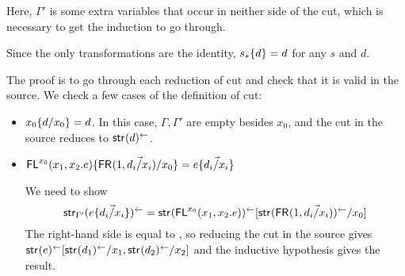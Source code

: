 \begin{enumerate}
\begin{itemize}
Here, $\Gamma'$ is some extra variables that occur in neither side of
the cut, which is necessary to get the induction to go through.

Since the only transformations are the identity, $s_*\{d\} = d$ for
any $s$ and $d$.  

The proof is to go through each reduction of cut and check that it is
valid in the source.  We check a few cases of the definition of cut:

\begin{itemize}
\item 
$x_0\{d/x_0\} = d$.  In this case, $\Gamma,\Gamma'$ are empty
  besides $x_0$, and the cut in the source reduces to $\mathsf{str}_{}(d)^{\leftarrow}$.


\item 
$\mathsf{FL}^{x_0}(x_1,x_2.e)\{\mathsf{FR}_{}(1,\vec{d_i/x_i})/x_0\} = {e\{\vec{d_i/x_i}\}}$

We need to show
\[
\mathsf{str}_{\Gamma'}({e\{\vec{d_i/x_i}\}})^{\leftarrow} = 
\mathsf{str}_{}({\mathsf{FL}^{x_0}(x_1,x_2.e)})^{\leftarrow}[\mathsf{str}_{}(\mathsf{FR}_{}(1,\vec{d_i/x_i}))^{\leftarrow}/x_0]
\]
The right-hand side is equal to
, 
so reducing the cut in the source gives 
$\mathsf{str}_{}(e)^{\leftarrow}[{\mathsf{str}_{}(d_1)^{\leftarrow}}/x_1,{\mathsf{str}_{}(d_2)^{\leftarrow}}/x_2]$
and the inductive hypothesis gives the result.  





\end{itemize}


\end{itemize}


\end{enumerate}
